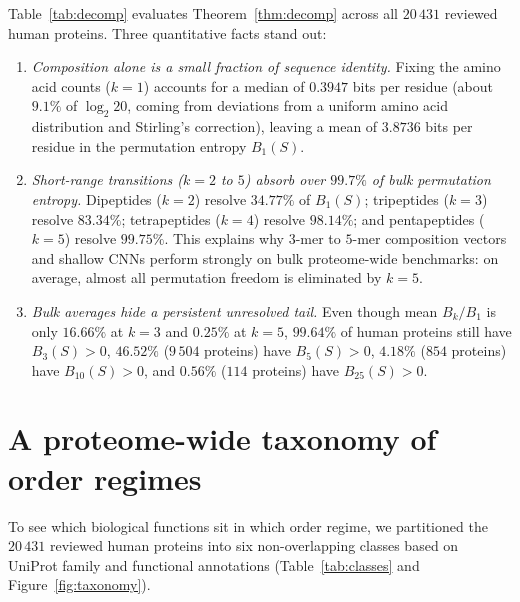 \documentclass[11pt]{article}
\theoremstyle{plain}
\theoremstyle{definition}
\theoremstyle{remark}
\begin{document}
Table~\ref{tab:decomp} evaluates Theorem~\ref{thm:decomp} across all $20\,431$ reviewed human proteins. Three
quantitative facts stand out:
\begin{enumerate}
\item \emph{Composition alone is a small fraction of sequence identity.} Fixing the amino acid counts ($k=1$)
accounts for a median of $0.3947$ bits per residue (about $9.1\%$ of $\log_2 20$, coming from deviations from a
uniform amino acid distribution and Stirling's correction), leaving a mean of $3.8736$ bits per residue in the
permutation entropy $B_1(S)$.
\item \emph{Short-range transitions ($k=2$ to $5$) absorb over $99.7\%$ of bulk permutation entropy.} Dipeptides
($k=2$) resolve $34.77\%$ of $B_1(S)$; tripeptides ($k=3$) resolve $83.34\%$; tetrapeptides ($k=4$) resolve
$98.14\%$; and pentapeptides ($k=5$) resolve $99.75\%$. This explains why $3$-mer to $5$-mer composition vectors
and shallow CNNs perform strongly on bulk proteome-wide benchmarks: on average, almost all permutation freedom is
eliminated by $k=5$.
\item \emph{Bulk averages hide a persistent unresolved tail.} Even though mean $B_k/B_1$ is only $16.66\%$ at $k=3$
and $0.25\%$ at $k=5$, $99.64\%$ of human proteins still have $B_3(S)>0$, $46.52\%$ ($9\,504$ proteins) have
$B_5(S)>0$, $4.18\%$ ($854$ proteins) have $B_{10}(S)>0$, and $0.56\%$ ($114$ proteins) have $B_{25}(S)>0$.
\end{enumerate}

\section{A proteome-wide taxonomy of order regimes}\label{sec:taxonomy}

To see which biological functions sit in which order regime, we partitioned the $20\,431$ reviewed human proteins
into six non-overlapping classes based on UniProt family and functional annotations (Table~\ref{tab:classes} and
Figure~\ref{fig:taxonomy}).
\end{document}
